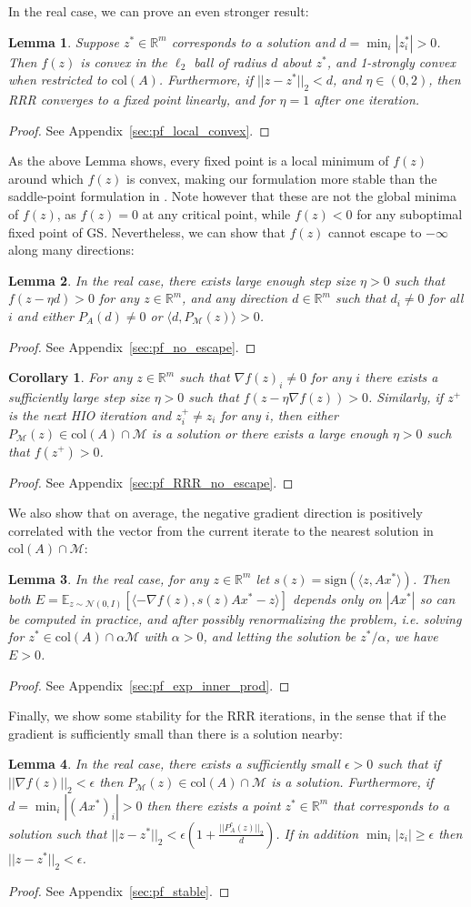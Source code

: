 \documentclass[12pt]{article}
\newtheorem{lemma}{Lemma}
\newtheorem{corollary}{Corollary}
\theoremstyle{definition}
\theoremstyle{remark}
\theoremstyle{definition}
\theoremstyle{problem}
\theoremstyle{definition}
\newcommand{\blem}{\begin{lemma}}
\newcommand{\elem}{\end{lemma}}
\newcommand{\bpof}{\begin{proof}}
\newcommand{\epof}{\end{proof}}
\newcommand{\bcor}{\begin{corollary}}
\newcommand{\ecor}{\end{corollary}}
\newcommand{\col}{\text{col}}
\newcommand{\sign}{\text{sign}}
\newcommand{\RR}{\mathbb{R} }
\newcommand{\MM}{\mathcal{M}}
\newcommand{\EE}{\mathbb{E}}
\begin{document}
In the real case, we can prove an even stronger result:
\blem\label{lem:local_convex} Suppose $z^*\in\RR^m$ corresponds to a solution and $d = \min_i|z^*_i| > 0$. Then $f(z)$ is convex in the $\ell_2$ ball of radius $d$ about $z^*$, and 1-strongly convex when restricted to $\col(A)$. Furthermore, if $||z-z^*||_2<d$, and $\eta\in(0,2)$, then RRR converges to a fixed point linearly, and for $\eta=1$ after one iteration. \elem
\bpof See Appendix~\ref{sec:pf_local_convex}. \epof

As the above Lemma shows, every fixed point is a local minimum of $f(z)$ around which $f(z)$ is convex, making our formulation more stable than the saddle-point formulation in \cite{Marchesini2007}. Note however that these are not the global minima of $f(z)$, as $f(z)=0$ at any critical point, while $f(z)<0$ for any suboptimal fixed point of GS. Nevertheless, we can show that $f(z)$ cannot escape to $-\infty$ along many directions:

\blem\label{lem:no_escape} In the real case, there exists large enough step size $\eta>0$ such that $f(z-\eta d) > 0$ for any $z\in\RR^m$, and any direction $d\in\RR^m$ such that $d_i\neq 0$ for all $i$ and either $P_A(d)\neq 0$ or $\langle d, P_{\MM}(z)\rangle > 0$. \elem
\bpof See Appendix~\ref{sec:pf_no_escape}. \epof

\bcor\label{cor:RRR_no_escape} For any $z\in\RR^m$ such that $\nabla f(z)_i\neq 0$ for any $i$ there exists a sufficiently large step size $\eta>0$ such that $f(z-\eta\nabla f(z)) > 0$. Similarly, if $z^+$ is the next HIO iteration and $z^+_i\neq z_i$ for any $i$, then either $P_{\MM}(z)\in\col(A)\cap\MM$ is a solution or there exists a large enough $\eta>0$ such that $f(z^+)>0$. \ecor
\bpof See Appendix~\ref{sec:pf_RRR_no_escape}. \epof

We also show that on average, the negative gradient direction is positively correlated with the vector from the current iterate to the nearest solution in $\col(A)\cap\MM$:
\blem\label{lem:exp_inner_prod} In the real case, for any $z\in\RR^m$ let $s(z) = \sign\left(\langle z, Ax^*\rangle\right)$. Then both $E = \EE_{z\sim\mathcal{N}(0, I)}\left[\langle -\nabla f(z), s(z)Ax^*-z\rangle\right]$ depends only on $|Ax^*|$ so can be computed in practice, and after possibly renormalizing the problem, i.e. solving for $z^*\in\col(A)\cap\alpha\MM$ with $\alpha>0$, and letting the solution be $z^*/\alpha$, we have $E>0$. \elem
\bpof See Appendix~\ref{sec:pf_exp_inner_prod}. \epof

Finally, we show some stability for the RRR iterations, in the sense that if the gradient is sufficiently small than there is a solution nearby:
\blem\label{lem:stable} In the real case, there exists a sufficiently small $\epsilon>0$ such that if $||\nabla f(z)||_2< \epsilon$ then $P_{\MM}(z)\in\col(A)\cap\MM$ is a solution. Furthermore, if $d=\min_i|(Ax^*)_i|>0$ then there exists a point $z^*\in\RR^m$ that corresponds to a solution such that $||z-z^*||_2<\epsilon\left(1 + \frac{||P_A^c(z)||_2}{d}\right)$. If in addition $\min_i|z_i|\geq\epsilon$ then $||z-z^*||_2< \epsilon$.\elem
\bpof See Appendix~\ref{sec:pf_stable}. \epof
\end{document}
